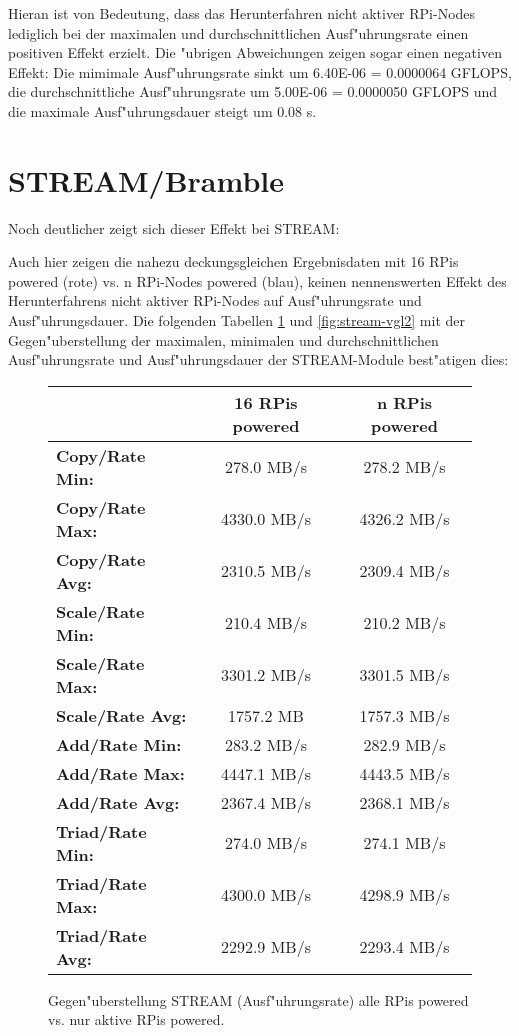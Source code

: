 Hieran ist von Bedeutung, dass das Herunterfahren nicht aktiver RPi-Nodes lediglich bei der maximalen und durchschnittlichen Ausf"uhrungsrate einen positiven Effekt erzielt. Die "ubrigen Abweichungen zeigen sogar einen negativen Effekt: Die mimimale Ausf"uhrungsrate sinkt um 6.40E-06 = 0.0000064 GFLOPS, die durchschnittliche Ausf"uhrungsrate um 5.00E-06 = 0.0000050 GFLOPS und die maximale Ausf"uhrungsdauer steigt um 0.08 s. 

\section{STREAM/Bramble}\label{Interpretation-Stream}

Noch deutlicher zeigt sich dieser Effekt bei STREAM: 


Auch hier zeigen die nahezu deckungsgleichen Ergebnisdaten mit 16 RPis powered (rote) vs. n RPi-Nodes powered (blau), keinen  nennenswerten Effekt des Herunterfahrens nicht aktiver RPi-Nodes auf Ausf"uhrungsrate und Ausf"uhrungsdauer. Die folgenden Tabellen \ref{fig:stream-vgl1} und \ref{fig:stream-vgl2} mit der Gegen"uberstellung der maximalen, minimalen und durchschnittlichen Ausf"uhrungsrate und Ausf"uhrungsdauer der STREAM-Module best"atigen dies: 

\begin{figure}[htb]
  \centering
  \begin{tabular}{|l|c|c|}
    \hline 
    & \textbf{16 RPis powered} & \textbf{n RPis powered}\\ 
    \hline 
    \textbf{Copy/Rate Min:} & 278.0 MB/s & 278.2 MB/s \\
    \hline 
	\textbf{Copy/Rate Max:} & 4330.0 MB/s & 4326.2 MB/s \\
    \hline
    \textbf{Copy/Rate Avg:} & 2310.5 MB/s & 2309.4 MB/s \\
 	\hline 
   	\textbf{Scale/Rate Min:} & 210.4 MB/s & 210.2 MB/s \\
   	\hline
   	\textbf{Scale/Rate Max:} & 3301.2 MB/s & 3301.5 MB/s \\
 	\hline 
   	\textbf{Scale/Rate Avg:} & 1757.2 MB & 1757.3 MB/s \\
 	\hline 
 	\textbf{Add/Rate Min:} & 283.2 MB/s & 282.9 MB/s \\
 	\hline 
   	\textbf{Add/Rate Max:} & 4447.1 MB/s & 4443.5 MB/s \\
  	\hline 
   	\textbf{Add/Rate Avg:} & 2367.4 MB/s & 2368.1 MB/s \\
 	\hline 
   	\textbf{Triad/Rate Min:} & 274.0 MB/s & 274.1 MB/s\\
 	\hline 	
   	\textbf{Triad/Rate Max:} & 4300.0 MB/s & 4298.9 MB/s \\
 	\hline 
   	\textbf{Triad/Rate Avg:} & 2292.9 MB/s & 2293.4 MB/s \\
   	\hline
 	\end{tabular}
  \caption{Gegen"uberstellung STREAM (Ausf"uhrungsrate) alle RPis powered vs. nur aktive RPis powered.}\label{fig:stream-vgl1}
\end{figure}


